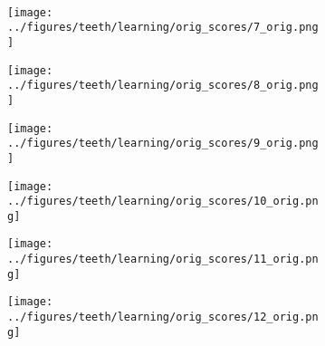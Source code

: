 \begin{figure}[h!]
\begin{subfigure}{0.16\textwidth}
	\end{subfigure}
	\vspace{-0.35cm}
	\\
	\begin{subfigure}{0.16\textwidth}
		\centering
		\texttt{[image: ../figures/teeth/learning/orig\_scores/7\_orig.png]}
		\label{fig:1}
	\end{subfigure}
	\begin{subfigure}{0.16\textwidth}
		\centering
		\texttt{[image: ../figures/teeth/learning/orig\_scores/8\_orig.png]}
		\label{fig:1}
	\end{subfigure}
	\begin{subfigure}{0.16\textwidth}
		\centering
		\texttt{[image: ../figures/teeth/learning/orig\_scores/9\_orig.png]}
		\label{fig:1}
	\end{subfigure}
	\begin{subfigure}{0.16\textwidth}
		\centering
		\texttt{[image: ../figures/teeth/learning/orig\_scores/10\_orig.png]}
		\label{fig:1}
	\end{subfigure}
	\begin{subfigure}{0.16\textwidth}
		\centering
		\texttt{[image: ../figures/teeth/learning/orig\_scores/11\_orig.png]}
		\label{fig:1}
	\end{subfigure}
	\begin{subfigure}{0.16\textwidth}
		\centering
		\texttt{[image: ../figures/teeth/learning/orig\_scores/12\_orig.png]}
		\label{fig:1}
	\end{subfigure}
	\caption{}\label{fig:teeth2}
\end{figure}

\newpage
